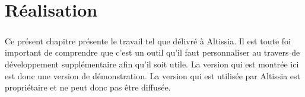 \chapter{Réalisation}
\label{ch:implementation}

\paragraph{}
Ce présent chapitre présente le travail tel que délivré à Altissia.
Il est toute foi important de comprendre que c'est un outil qu'il faut personnaliser au travers de développement supplémentaire afin qu'il soit utile.
La version qui est montrée ici est donc une version de démonstration.
La version qui est utilisée par Altissia est propriétaire et ne peut donc pas être diffusée.



